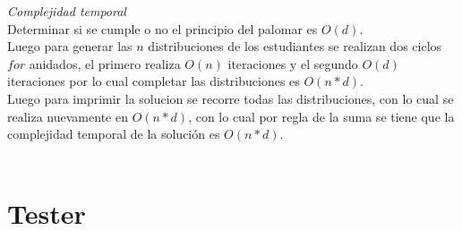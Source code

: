 \documentclass[12pt]{article}
\begin{document}
   
\textit{Complejidad temporal}\\

 Determinar si se cumple o no el principio del palomar es $O(d)$.\\
 Luego para generar las $n$ distribuciones de los estudiantes se realizan dos ciclos $for$ anidados, el primero realiza $O(n)$ iteraciones y el segundo $O(d)$ iteraciones por lo cual completar las distribuciones es $O(n*d)$.\\
 Luego para imprimir la solucion se recorre todas las distribuciones, con lo cual se realiza nuevamente en $O(n*d)$, con lo cual por regla de la suma se tiene que la complejidad temporal de la soluci\'on es $O(n*d)$.\\
 \\

\section{Tester}
\end{document}
